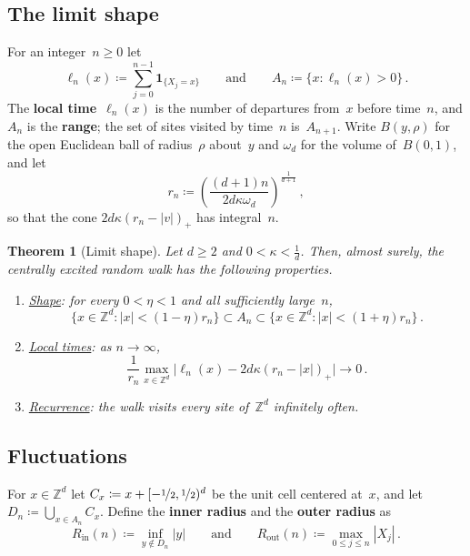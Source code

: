 \documentclass[11pt]{amsart}
\theoremstyle{plain}
\newtheorem{theorem}{Theorem}[section]
\theoremstyle{definition}
\newcommand{\Z}{\mathbb Z}
\newcommand{\drift}{\kappa}
\newcommand{\ind}{\mathbf 1}
\newcommand{\defn}[1]{\textbf{#1}}
\newcommand{\nf}{\nicefrac}
\newcommand{\Rin}{R_{\mathrm{in}}}
\newcommand{\Rout}{R_{\mathrm{out}}}
\numberwithin{equation}{section}
\begin{document}
\subsection{The limit shape}\label{sec:shape}

For an integer~$n\geq0$ let
\begin{equation*}
\ell_n(x)\coloneqq\sum_{j=0}^{n-1}\ind_{\{X_j=x\}}
\qquad\text{and}\qquad
A_n\coloneqq\{x:\ell_n(x)>0\}\, .
\end{equation*}
The \defn{local time}~$\ell_n(x)$ is the number of departures from~$x$ before time~$n$, and $A_n$ is the \defn{range}; the set of sites visited by time~$n$ is~$A_{n+1}$. Write $B(y,\rho)$ for the open Euclidean ball of radius~$\rho$ about~$y$ and $\omega_d$ for the volume of~$B(0,1)$, and let
\begin{equation}\label{eq:radius}
r_n\coloneqq\left(\frac{(d+1)n}{2d\drift\omega_d}\right)^{\frac{1}{d+1}}\, ,
\end{equation}
so that the cone $2d\drift(r_n-|v|)_+$ has integral~$n$. 

\begin{theorem}[Limit shape]\label{thm:shape}
Let $d\geq2$ and $0<\drift< \frac1d$. Then, almost surely, the centrally excited random walk has the following properties.
\begin{enumerate}[label=\textup{(\roman*)}]
\item \underline{\emph{Shape}}: for every $0<\eta<1$ and all sufficiently large~$n$,
\begin{equation*}
\{x\in\Z^d:|x|<(1-\eta)r_n\}\subset A_n\subset\{x\in\Z^d:|x|<(1+\eta)r_n\}\, .
\end{equation*}
\item \underline{\emph{Local times}}: as $n\to\infty$,
\begin{equation*}
\frac1{r_n}\max_{x\in\Z^d}\bigl|\ell_n(x)-2d\drift(r_n-|x|)_+\bigr|\longrightarrow0\, .
\end{equation*}
\item \underline{\emph{Recurrence}}: the walk visits every site of~$\Z^d$ infinitely often.
\end{enumerate}
\end{theorem}

\subsection{Fluctuations}\label{sec:fluct-intro}

For $x\in\Z^d$ let $C_x\coloneqq x+[-\nf12,\nf12)^d$ be the unit cell centered at~$x$, and let $D_n\coloneqq\bigcup_{x\in A_n}C_x$. Define the \defn{inner radius} and the \defn{outer radius} as
\begin{equation}\label{eq:radii}
\Rin(n)\coloneqq\inf_{y\notin D_n}|y|
\qquad\text{and}\qquad
\Rout(n)\coloneqq\max_{0\leq j\leq n}|X_j|\, .
\end{equation}
\end{document}
